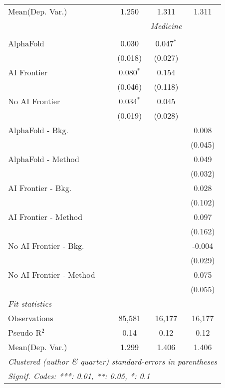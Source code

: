 \begin{tabular}{lccc}
Mean(Dep. Var.) & 1.250 & 1.311 & 1.311 \\
 & \multicolumn{3}{c}{\textit{Medicine}} \\ \\
   AlphaFold               & 0.030       & 0.047$^{*}$ &   \\   
                           & (0.018)     & (0.027)     &   \\   
   AI Frontier             & 0.080$^{*}$ & 0.154       &   \\   
                           & (0.046)     & (0.118)     &   \\   
   No AI Frontier          & 0.034$^{*}$ & 0.045       &   \\   
                           & (0.019)     & (0.028)     &   \\   
   AlphaFold - Bkg.        &             &             & 0.008\\   
                           &             &             & (0.045)\\   
   AlphaFold - Method      &             &             & 0.049\\   
                           &             &             & (0.032)\\   
   AI Frontier - Bkg.      &             &             & 0.028\\   
                           &             &             & (0.102)\\   
   AI Frontier - Method    &             &             & 0.097\\   
                           &             &             & (0.162)\\   
   No AI Frontier - Bkg.   &             &             & -0.004\\   
                           &             &             & (0.029)\\   
   No AI Frontier - Method &             &             & 0.075\\   
                           &             &             & (0.055)\\   
   \midrule
   \emph{Fit statistics}\\
   Observations            & 85,581      & 16,177      & 16,177\\  
   Pseudo R$^2$            & 0.14        & 0.12        & 0.12\\  
Mean(Dep. Var.) & 1.299 & 1.406 & 1.406 \\
   \midrule \midrule
   \multicolumn{4}{l}{\emph{Clustered (author \& quarter) standard-errors in parentheses}}\\
   \multicolumn{4}{l}{\emph{Signif. Codes: ***: 0.01, **: 0.05, *: 0.1}}\\
\end{tabular}
\par\endgroup
